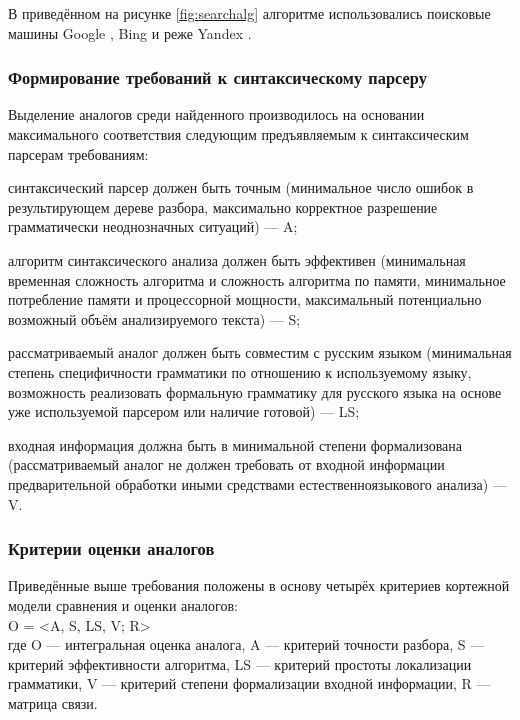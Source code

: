 В приведённом на рисунке \ref{fig:searchalg} алгоритме использовались поисковые машины Google \cite{google}, Bing \cite{bing} и реже Yandex \cite{yandex}.

\subsubsection{Формирование требований к синтаксическому парсеру}
Выделение аналогов среди найденного производилось на основании максимального соответствия следующим предъявляемым к синтаксическим парсерам требованиям:
\begin{list}{}{\leftmargin=1.5cm}
	\item синтаксический парсер должен быть точным (минимальное число ошибок в результирующем дереве разбора, максимально корректное разрешение грамматически неоднозначных ситуаций) --- A;
	\item алгоритм синтаксического анализа должен быть эффективен (минимальная временная сложность алгоритма и сложность алгоритма по памяти, минимальное потребление памяти и процессорной мощности, максимальный потенциально возможный объём анализируемого текста) --- S;
	\item рассматриваемый аналог должен быть совместим с русским языком (минимальная степень специфичности грамматики по отношению к используемому языку, возможность реализовать формальную грамматику для русского языка на основе уже используемой парсером или наличие готовой) --- LS;
	\item входная информация должна быть в минимальной степени формализована (рассматриваемый аналог не должен требовать от входной информации предварительной обработки иными средствами естественноязыкового анализа) --- V.
\end{list}

\subsubsection{Критерии оценки аналогов}
Приведённые выше требования положены в основу четырёх критериев кортежной модели сравнения и оценки аналогов:\\
O = <A, S, LS, V; R>\\
где O --- интегральная оценка аналога, A --- критерий точности разбора, S --- критерий эффективности алгоритма, LS --- критерий простоты локализации грамматики, V --- критерий степени формализации входной информации, R --- матрица связи.

